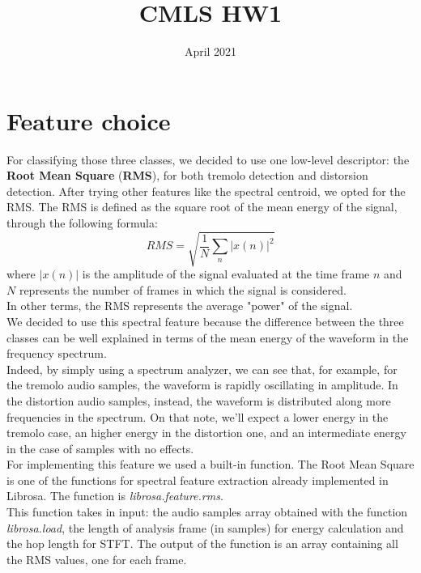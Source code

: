 \documentclass{article}
\title{CMLS HW1}
\author{}
\date{April 2021}
\begin{document}
\maketitle

\section{Feature choice}
For classifying those three classes, we decided to use one low-level descriptor: the \textbf{Root Mean Square} (\textbf{RMS}), for both tremolo detection and distorsion detection. 
After trying other features like the spectral centroid, we opted for the RMS. The RMS is defined as the square root of the mean energy of the signal, through the following formula:
\[ RMS =\sqrt{\frac{1}{N}\sum_{n}^{}|x(n)|^2}  \] where $|x(n)|$ is the amplitude of the signal evaluated at the time frame $n$ and $N$ represents the number of frames in which the signal is considered.
\\In other terms, the RMS represents the average "power" of the signal.
\\We decided to use this spectral feature because the difference between the three classes can be well explained in terms of the mean energy of the waveform in the frequency spectrum.
\\Indeed, by simply using a spectrum analyzer, we can see that, for example, for the tremolo audio samples, the waveform is rapidly oscillating in amplitude. In the distortion audio samples, instead, the waveform is distributed along more frequencies in the spectrum. On that note, we'll expect a lower energy in the tremolo case, an higher energy in the distortion one, and an intermediate energy in the case of samples with no effects.
\\For implementing this feature we used a built-in function. The Root Mean Square is one of the functions for spectral feature extraction already implemented in Librosa. The function is \emph{librosa.feature.rms}.
\\This function takes in input: the audio samples array obtained with the function \emph{librosa.load}, the length of analysis frame (in samples) for energy calculation and the hop length for STFT. 
The output of the function is an array containing all the RMS values, one for each frame.
\end{document}
